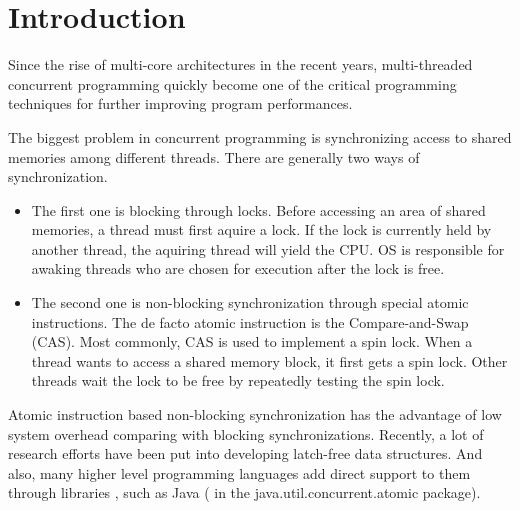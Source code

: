 \documentclass{sig-alternate}
\begin{document}

\author {
\alignauthor
Shengliang Xu\\
}
\maketitle

\section{Introduction}

Since the rise of multi-core architectures in the recent years,
multi-threaded concurrent programming quickly become one of the
critical programming techniques for further improving program
performances. 

The biggest problem in concurrent programming is synchronizing access
to shared memories among different threads. There are generally two
ways of synchronization. 

\begin{itemize} 

  \item The first one is blocking through locks. Before accessing an
    area of shared memories, a thread must first aquire a lock. If the
    lock is currently held by another thread, the aquiring thread will
    yield the CPU. OS is responsible for awaking threads who are
    chosen for execution after the lock is free.  

  \item The second one is non-blocking synchronization through special
    atomic instructions. The de facto atomic instruction is the
    Compare-and-Swap (CAS). Most commonly, CAS is used to implement a
    spin lock. When a thread wants to access a shared memory block, it
    first gets a spin lock.  Other threads wait the lock to be free by
    repeatedly testing the spin lock.

\end{itemize}

Atomic instruction based non-blocking synchronization has the
advantage of low system overhead comparing with blocking
synchronizations. Recently, a lot of research efforts have been put
into developing latch-free data structures. And also, many higher
level programming languages add direct support to them through
libraries , such as Java ( in the java.util.concurrent.atomic package). 
\end{document}
